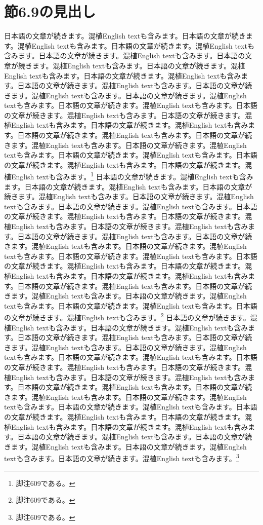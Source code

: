 \documentclass[pdflatex,book]{jlreq}
\begin{document}
\section{節6.9の見出し}
日本語の文章が続きます。混植English textも含みます。日本語の文章が続きます。混植English textも含みます。日本語の文章が続きます。混植English textも含みます。日本語の文章が続きます。混植English textも含みます。日本語の文章が続きます。混植English textも含みます。日本語の文章が続きます。混植English textも含みます。日本語の文章が続きます。混植English textも含みます。日本語の文章が続きます。混植English textも含みます。日本語の文章が続きます。混植English textも含みます。日本語の文章が続きます。混植English textも含みます。日本語の文章が続きます。混植English textも含みます。日本語の文章が続きます。混植English textも含みます。日本語の文章が続きます。混植English textも含みます。日本語の文章が続きます。混植English textも含みます。日本語の文章が続きます。混植English textも含みます。日本語の文章が続きます。混植English textも含みます。日本語の文章が続きます。混植English textも含みます。日本語の文章が続きます。混植English textも含みます。日本語の文章が続きます。混植English textも含みます。日本語の文章が続きます。混植English textも含みます。\footnote{脚注609である。}
日本語の文章が続きます。混植English textも含みます。日本語の文章が続きます。混植English textも含みます。日本語の文章が続きます。混植English textも含みます。日本語の文章が続きます。混植English textも含みます。日本語の文章が続きます。混植English textも含みます。日本語の文章が続きます。混植English textも含みます。日本語の文章が続きます。混植English textも含みます。日本語の文章が続きます。混植English textも含みます。日本語の文章が続きます。混植English textも含みます。日本語の文章が続きます。混植English textも含みます。日本語の文章が続きます。混植English textも含みます。日本語の文章が続きます。混植English textも含みます。日本語の文章が続きます。混植English textも含みます。日本語の文章が続きます。混植English textも含みます。日本語の文章が続きます。混植English textも含みます。日本語の文章が続きます。混植English textも含みます。日本語の文章が続きます。混植English textも含みます。日本語の文章が続きます。混植English textも含みます。日本語の文章が続きます。混植English textも含みます。日本語の文章が続きます。混植English textも含みます。\footnote{脚注609である。}
日本語の文章が続きます。混植English textも含みます。日本語の文章が続きます。混植English textも含みます。日本語の文章が続きます。混植English textも含みます。日本語の文章が続きます。混植English textも含みます。日本語の文章が続きます。混植English textも含みます。日本語の文章が続きます。混植English textも含みます。日本語の文章が続きます。混植English textも含みます。日本語の文章が続きます。混植English textも含みます。日本語の文章が続きます。混植English textも含みます。日本語の文章が続きます。混植English textも含みます。日本語の文章が続きます。混植English textも含みます。日本語の文章が続きます。混植English textも含みます。日本語の文章が続きます。混植English textも含みます。日本語の文章が続きます。混植English textも含みます。日本語の文章が続きます。混植English textも含みます。日本語の文章が続きます。混植English textも含みます。日本語の文章が続きます。混植English textも含みます。日本語の文章が続きます。混植English textも含みます。日本語の文章が続きます。混植English textも含みます。日本語の文章が続きます。混植English textも含みます。\footnote{脚注609である。}
\end{document}
